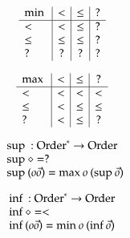 \begin{definition}
\[
\begin{array}{l | c |c | c}
 \mathrm{min}\: &  <      &  \leq    & ? \\
\hline
  <    & <       &  \leq    &   ? \\
 \leq  & \leq    &  \leq    &   ?  \\
 ?     & ?       &  ?       &   ?
\end{array}
\]
\end{definition}

\begin{definition}
\[
\begin{array}{l | c |c | c}
 \mathrm{max}\: & <      &  \leq    &   ? \\
\hline
  <    & <       & <       &   <    \\
 \leq  & <       & \leq    &   \leq  \\
 ?     & <       & \leq    &   ?
\end{array}
\]
\end{definition}

\begin{definition}
\[
\begin{array}[t]{ll}
\multicolumn{2}{l}{\supo : \ves{\order} \ra \order}\\ 
\supo \diamond = ? \\
\supo (o \vec{o} ) = \maxo o \: (\supo \vec{o}) \\
\end{array}
\]
\end{definition}

\begin{definition}
\[
\begin{array}[t]{ll}
\multicolumn{2}{l}{\info : \ves{\order} \ra \order}\\ 
\info \diamond = < \\
\info (o \vec{o} ) = \mino o \: (\info \vec{o}) \\
\end{array}
\]
\end{definition}

\newcommand{\cmp}{\mathrm{cmp}\:}
\newcommand{\cmpv}{\mathrm{cmpv}}
\newcommand{\cmps}{\mathrm{cmps}}
\newcommand{\cmpsv}{\mathrm{cmpsv}}
\newcommand{\etp}{\mathrm{etp}\:}


